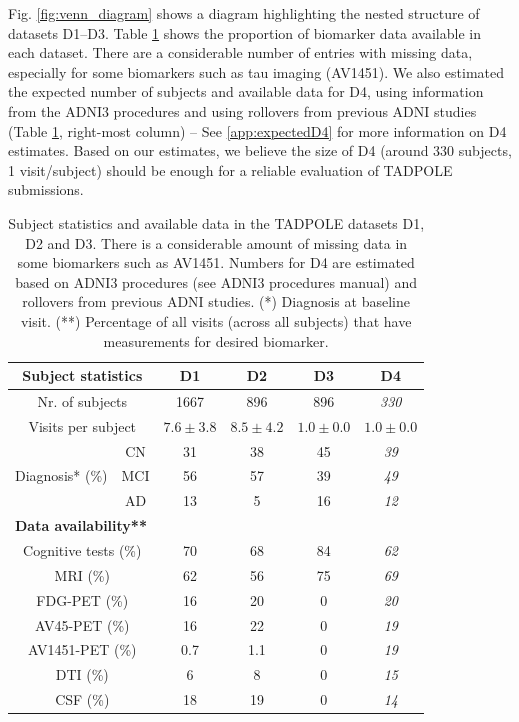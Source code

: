 Fig. \ref{fig:venn_diagram} shows a diagram highlighting the nested structure of datasets D1--D3. Table \ref{tab:biomk_data_available} shows the proportion of biomarker data available in each dataset. There are a considerable number of entries with missing data, especially for some biomarkers such as tau imaging (AV1451). We also estimated the expected number of subjects and available data for D4, using information from the ADNI3 procedures and using rollovers from previous ADNI studies (Table \ref{tab:biomk_data_available}, right-most column) -- See \ref{app:expectedD4} for more information on D4 estimates. Based on our estimates, we believe the size of D4 (around 330 subjects, 1 visit/subject) should be enough for a reliable evaluation of TADPOLE submissions.


\begin{table}
\centering
 \begin{tabular}{c | c | c c c c}
 \multicolumn{2}{c|}{\textbf{Subject statistics}} & D1 & D2 & D3 & D4 \\
 \hline
 \multicolumn{2}{c|}{Nr. of subjects } & 1667 & 896 & 896 & \emph{330}\\
 \multicolumn{2}{c|}{Visits per subject }&  $\mathbin{{7.6}{\pm}{3.8}}$  & $\mathbin{{8.5}{\pm}{4.2}}$ & $\mathbin{{1.0}{\pm}{0.0}}$ & $\mathit{\mathbin{{1.0}{\pm}{0.0}}}$\\
 & CN & 31 & 38 & 45 & \emph{39} \\
 Diagnosis* (\%) & MCI & 56 & 57 & 39 & \emph{49} \\
 & AD & 13 & 5 & 16 & \emph{12} \\
 \multicolumn{2}{l}{\textbf{Data availability**}}\\
 \hline
 \multicolumn{2}{c|}{Cognitive tests (\%) } & 70 & 68 & 84 & \emph{62} \\
 \multicolumn{2}{c|}{MRI (\%) } & 62 & 56 & 75 & \emph{69} \\
 \multicolumn{2}{c|}{FDG-PET (\%) } & 16 & 20 & 0 & \emph{20} \\
 \multicolumn{2}{c|}{AV45-PET (\%) } & 16 & 22 & 0 & \emph{19} \\
 \multicolumn{2}{c|}{AV1451-PET (\%) } & 0.7 & 1.1 & 0 & \emph{19} \\
 \multicolumn{2}{c|}{DTI (\%) } & 6 & 8 & 0 & \emph{15} \\
 \multicolumn{2}{c|}{CSF (\%) } & 18 & 19 & 0 & \emph{14} \\
 \end{tabular}
  
 \caption[Subject statistics and available data in the TADPOLE datasets D1, D2, D3 and D4.]{Subject statistics and available data in the TADPOLE datasets D1, D2 and D3. There is a considerable amount of missing data in some biomarkers such as AV1451. Numbers for D4 are estimated based on ADNI3 procedures (see ADNI3 procedures manual) and rollovers from previous ADNI studies. (*) Diagnosis at baseline visit. (**) Percentage of all visits (across all subjects) that have measurements for desired biomarker.}
 \label{tab:biomk_data_available}
\end{table}




